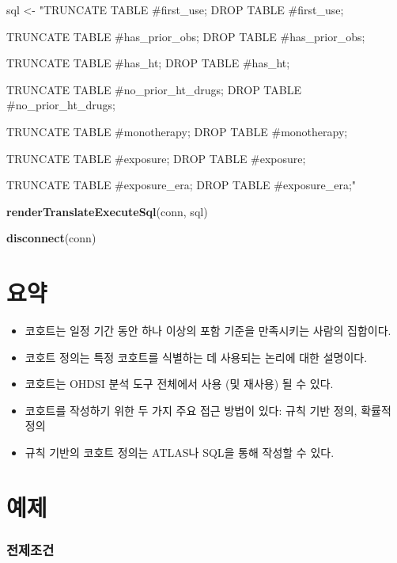\documentclass[11pt]{book}
\newenvironment{Shaded}{\begin{snugshade}}{\end{snugshade}}
\newcommand{\KeywordTok}[1]{\textcolor[rgb]{0.13,0.29,0.53}{\textbf{#1}}}
\newcommand{\StringTok}[1]{\textcolor[rgb]{0.31,0.60,0.02}{#1}}
\newcommand{\NormalTok}[1]{#1}
\theoremstyle{definition}
\theoremstyle{definition}
\theoremstyle{definition}
\theoremstyle{remark}
\let\BeginKnitrBlock\begin \let\EndKnitrBlock\end
\begin{document}
\begin{Shaded}
\begin{Highlighting}[]
\NormalTok{sql <-}\StringTok{ "TRUNCATE TABLE #first_use;}
\StringTok{DROP TABLE #first_use;}

\StringTok{TRUNCATE TABLE #has_prior_obs;}
\StringTok{DROP TABLE #has_prior_obs;}

\StringTok{TRUNCATE TABLE #has_ht;}
\StringTok{DROP TABLE #has_ht;}

\StringTok{TRUNCATE TABLE #no_prior_ht_drugs;}
\StringTok{DROP TABLE #no_prior_ht_drugs;}

\StringTok{TRUNCATE TABLE #monotherapy;}
\StringTok{DROP TABLE #monotherapy;}

\StringTok{TRUNCATE TABLE #exposure;}
\StringTok{DROP TABLE #exposure;}

\StringTok{TRUNCATE TABLE #exposure_era;}
\StringTok{DROP TABLE #exposure_era;"}

\KeywordTok{renderTranslateExecuteSql}\NormalTok{(conn, sql)}

\KeywordTok{disconnect}\NormalTok{(conn)}
\end{Highlighting}
\end{Shaded}

\section{요약}\label{-8}

\BeginKnitrBlock{rmdsummary}
\begin{itemize}
\item
  코호트는 일정 기간 동안 하나 이상의 포함 기준을 만족시키는 사람의
  집합이다.
\item
  코호트 정의는 특정 코호트를 식별하는 데 사용되는 논리에 대한 설명이다.
\item
  코호트는 OHDSI 분석 도구 전체에서 사용 (및 재사용) 될 수 있다.
\item
  코호트를 작성하기 위한 두 가지 주요 접근 방법이 있다: 규칙 기반 정의,
  확률적 정의
\item
  규칙 기반의 코호트 정의는 ATLAS나 SQL을 통해 작성할 수 있다.
\end{itemize}
\EndKnitrBlock{rmdsummary}

\section{예제}\label{-5}

\subsubsection*{전제조건}\label{-2}
\end{document}
